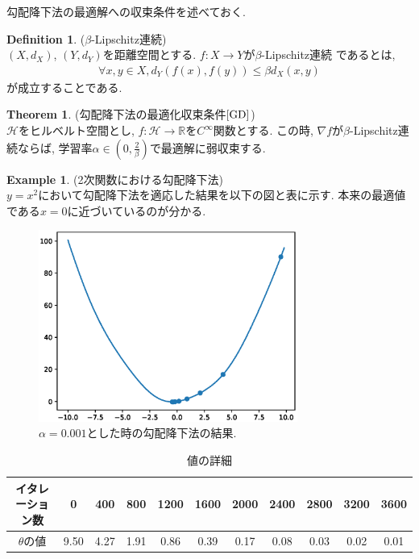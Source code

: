 \documentclass[11pt, a4paper, dvipdfmx]{jsarticle}
\theoremstyle{definition}
\newtheorem{Definition+}[Axiom+]{Definition}
\newtheorem{Theorem+}[Axiom+]{Theorem}
\newtheorem{Example+}[Axiom+]{Example}
\newcommand{\R}{\mathbb{R}}
\newcommand{\Hil}{\mathcal{H}}
\begin{document}
勾配降下法の最適解への収束条件を述べておく.
\begin{Definition+}($\beta$-Lipschitz連続)\\
    $(X, d_{X})$, $(Y, d_{Y})$を距離空間とする. $f:X\to Y$が$\beta$-Lipschitz連続
    であるとは,
    \begin{align*}
        \forall x, y\in X, d_{Y}(f(x), f(y))\leq\beta d_{X}(x, y)
    \end{align*}
    が成立することである.
\end{Definition+}
\begin{Theorem+}(勾配降下法の最適化収束条件$\cite{GD}$)\\
    $\Hil$をヒルベルト空間とし, $f:\Hil\to\R$を$C^{\infty}$関数とする. 
    この時, $\nabla f$が$\beta$-Lipschitz連続ならば, 学習率$\alpha\in\left(0, \frac{2}{\beta}\right)$で最適解に弱収束する.
\end{Theorem+}
\begin{Example+}(2次関数における勾配降下法)\\
    $y = x^2$において勾配降下法を適応した結果を以下の図と表に示す.
    本来の最適値である$x = 0$に近づいているのが分かる.
    \begin{figure}[H]
        \centering
        \includegraphics[width = 8.5cm]{Images/Gradient_Decent.eps}
        \caption{$\alpha = 0.001$とした時の勾配降下法の結果.}
    \end{figure}
    \begin{table}[H]
        \centering
        \begin{tabular}{|c|c|c|c|c|c|c|c|c|c|c|}\hline
            イタレーション数 & 0 & 400 & 800 & 1200 & 1600 & 2000 & 2400 & 2800 & 3200 & 3600\\\hline
            $\theta$の値 & 9.50 & 4.27 & 1.91 & 0.86 & 0.39 & 0.17 & 0.08 & 0.03 & 0.02 & 0.01\\\hline
        \end{tabular}
        \caption{値の詳細}
    \end{table}
\end{Example+}
\end{document}
